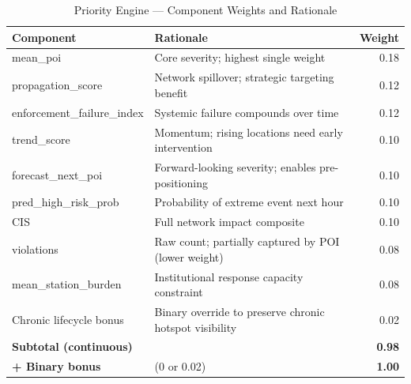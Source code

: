 \documentclass[12pt,a4paper]{article}
\begin{document}
\begin{table}[htbp]
\centering
\caption{Priority Engine — Component Weights and Rationale}
\label{tab:priority}
\begin{tabularx}{\textwidth}{@{}lXr@{}}
\toprule
\textbf{Component} & \textbf{Rationale} & \textbf{Weight}\\
\midrule
mean\_poi             & Core severity; highest single weight                              & 0.18\\
propagation\_score    & Network spillover; strategic targeting benefit                    & 0.12\\
enforcement\_failure\_index & Systemic failure compounds over time                      & 0.12\\
trend\_score          & Momentum; rising locations need early intervention                & 0.10\\
forecast\_next\_poi   & Forward-looking severity; enables pre-positioning                 & 0.10\\
pred\_high\_risk\_prob& Probability of extreme event next hour                            & 0.10\\
CIS                   & Full network impact composite                                     & 0.10\\
violations            & Raw count; partially captured by POI (lower weight)               & 0.08\\
mean\_station\_burden & Institutional response capacity constraint                        & 0.08\\
Chronic lifecycle bonus& Binary override to preserve chronic hotspot visibility           & 0.02\\
\midrule
\textbf{Subtotal (continuous)} & & \textbf{0.98}\\
\textbf{+ Binary bonus} & (0 or 0.02) & \textbf{1.00}\\
\bottomrule
\end{tabularx}
\end{table}
\end{document}
